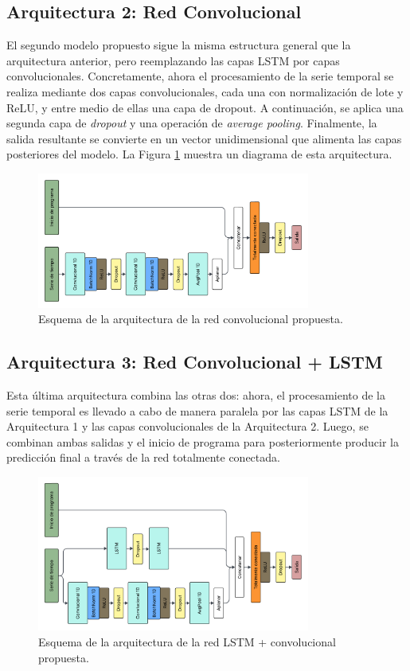 \documentclass[../../main.tex]{subfiles}
\begin{document}
\subsection{Arquitectura 2: Red Convolucional}
El segundo modelo propuesto sigue la misma estructura general que la arquitectura
anterior, pero reemplazando las capas LSTM por capas convolucionales. Concretamente, ahora
el procesamiento de la serie temporal se realiza mediante dos capas convolucionales, cada
una con normalización de lote y ReLU, y entre medio de ellas una capa de dropout. A
continuación, se aplica una segunda capa de \textit{dropout} y una operación de
\textit{average pooling}. Finalmente, la salida resultante se convierte en un vector
unidimensional que alimenta las capas posteriores del modelo. La Figura \ref{fig:conv}
muestra un diagrama de esta arquitectura.
\begin{figure}[h]
    \centering
    \includegraphics[width=0.8\textwidth]{figs/conv.png}
    \caption{Esquema de la arquitectura de la red convolucional propuesta.}
    \label{fig:conv}
\end{figure}

\subsection{Arquitectura 3: Red Convolucional + LSTM}
Esta última arquitectura combina las otras dos: ahora, el procesamiento de la serie
temporal es llevado a cabo de manera paralela por las capas LSTM de la Arquitectura 1
y las capas convolucionales de la Arquitectura 2. Luego, se combinan ambas salidas y
el inicio de programa para posteriormente producir la predicción final a través de la
red totalmente conectada.
\begin{figure}[h]
    \centering
    \includegraphics[width=0.8\textwidth]{figs/lstm_conv.png}
    \caption{Esquema de la arquitectura de la red LSTM + convolucional propuesta.}
    \label{fig:lstm_v2_conv}
\end{figure}
\end{document}
